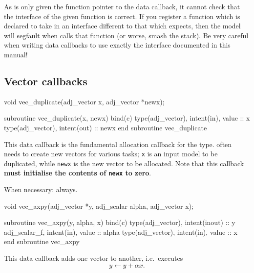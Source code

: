 As \libadjoint is only given the function pointer to the data callback, it cannot check that the
interface of the given function is correct. If you register a function which is declared to take 
in an interface different to that which \libadjoint expects, then the model will segfault when
\libadjoint calls that function (or worse, smash the stack). Be very careful when writing data callbacks to use exactly
the interface documented in this manual!

\subsection{Vector callbacks} \label{sec:vector_callbacks}
\begin{framed}
\begin{minipage}{\columnwidth}
\begin{ccode}
  void vec_duplicate(adj_vector x, adj_vector *newx);
\end{ccode}
\begin{fortrancode}
  subroutine vec_duplicate(x, newx) bind(c)
    type(adj_vector), intent(in), value :: x
    type(adj_vector), intent(out) :: newx
  end subroutine vec_duplicate
\end{fortrancode}
\end{minipage}
\end{framed}
This data callback is the fundamental allocation callback for the  type. \libadjoint
often needs to create new vectors for various tasks; \texttt{x} is an
input model  to be duplicated, while \texttt{newx} is the new vector
to be allocated. Note that this callback \textbf{must initialise the contents of \texttt{newx} to zero}.

When necessary: always.
\begin{framed}
\begin{minipage}{\columnwidth}
\begin{ccode}
  void vec_axpy(adj_vector *y, adj_scalar alpha, adj_vector x);
\end{ccode}
\begin{fortrancode}
  subroutine vec_axpy(y, alpha, x) bind(c)
    type(adj_vector), intent(inout) :: y
    adj_scalar_f, intent(in), value :: alpha
    type(adj_vector), intent(in), value :: x
  end subroutine vec_axpy
\end{fortrancode}
\end{minipage}
\end{framed}
This data callback adds one vector to another, i.e.\ executes
\begin{equation*}
y \leftarrow y + \alpha x.
\end{equation*}

